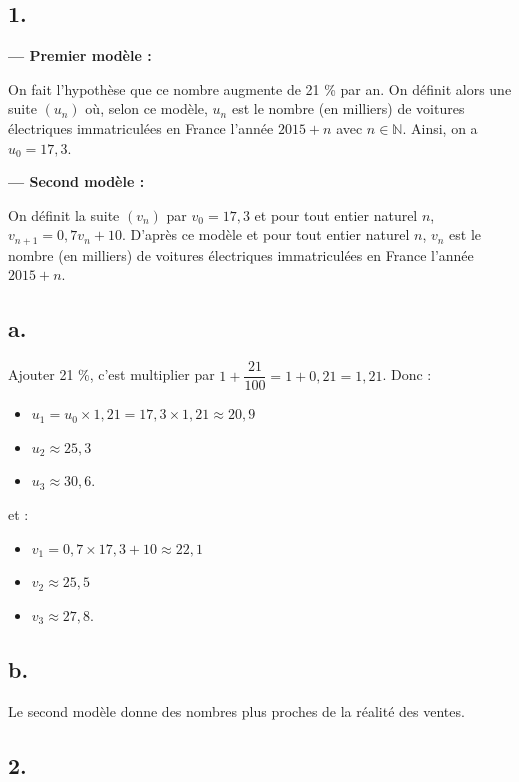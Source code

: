 \subsection*{1.}
	
	\noindent
	\textbf{--- Premier modèle :}
	
	On fait l'hypothèse que ce nombre augmente de 21 \% par an. On définit alors une suite \((u_n)\) où, selon ce modèle, \(u_n\) est le nombre (en milliers) de voitures électriques immatriculées en France l'année \(2015+n\) avec \(n \in \mathbb{N}\). Ainsi, on a \(u_0 = 17,3\).
	
	\noindent
	\textbf{--- Second modèle :}
	
	On définit la suite \((v_n)\) par \(v_0 = 17,3\) et pour tout entier naturel \(n\), \(v_{n+1} = 0,7v_n +10\). D'après ce modèle et pour tout entier naturel \(n\), \(v_n\) est le nombre (en milliers) de voitures électriques immatriculées en France l'année \(2015+n\).
	
	\subsection*{a.}
	
	Ajouter 21 \%, c'est multiplier par \(1 + \dfrac{21}{100} = 1 + 0,21 = 1,21\). Donc :
	
	\begin{itemize}
		\item $u_1 = u_0 \times 1,21 = 17,3 \times 1,21 \approx 20,9$
		\item $u_2 \approx 25,3$
		\item $u_3 \approx 30,6$.
	\end{itemize}
	et :
	\begin{itemize}
		\item $v_1 = 0,7 \times 17,3 + 10 \approx 22,1$
		\item $v_2 \approx 25,5$
		\item $v_3 \approx 27,8$.
	\end{itemize}
	
	\subsection*{b.}
	
	Le second modèle donne des nombres plus proches de la réalité des ventes.
	
	\subsection*{2.}
	
